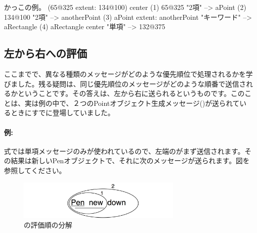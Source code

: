 \documentclass[a4paper,10pt,twoside]{book}
\begin{document}
\begin{example}[decExtent]{かっこの例。}{}
      (65@325 extent: 134@100) center
(1)   65@325                                                    "2項"
    --> aPoint
(2)                                134@100                     "2項"
                                 --> anotherPoint
(3)   aPoint extent: anotherPoint                       "キーワード"
      --> aRectangle
(4)   aRectangle center                                     "単項"
      --> 132@375
\end{example}

\subsection{左から右への評価}
ここまでで、異なる種類のメッセージがどのような優先順位で処理されるかを学びました。残る疑問は、同じ優先順位のメッセージがどのような順番で送信されるかということです。その答えは、左から右に送られるというものです。このことは、実は例の中で、２つのPointオブジェクト生成メッセージ()が送られているときにすでに登場していました。



\paragraph{例:} 式では単項メッセージのみが使われているので、左端のがまず送信されます。その結果は新しいPenオブジェクトで、それに次のメッセージが送られます。図を参照してください。

\begin{figure}
	\centering
	\includegraphics[width=8cm]{ucompoUn}
	\caption{の評価順の分解}
\end{figure}
\end{document}
